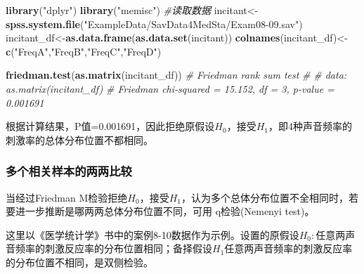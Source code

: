 \documentclass[
]{article}
\newenvironment{Shaded}{\begin{snugshade}}{\end{snugshade}}
\newcommand{\CommentTok}[1]{\textcolor[rgb]{0.56,0.35,0.01}{\textit{#1}}}
\newcommand{\KeywordTok}[1]{\textcolor[rgb]{0.13,0.29,0.53}{\textbf{#1}}}
\newcommand{\NormalTok}[1]{#1}
\newcommand{\StringTok}[1]{\textcolor[rgb]{0.31,0.60,0.02}{#1}}
\begin{document}
\begin{Shaded}
\begin{Highlighting}[]
\KeywordTok{library}\NormalTok{(}\StringTok{"dplyr"}\NormalTok{)}
\KeywordTok{library}\NormalTok{(}\StringTok{"memisc"}\NormalTok{)}
\CommentTok{#读取数据}
\NormalTok{incitant<-}\KeywordTok{spss.system.file}\NormalTok{(}\StringTok{"ExampleData/SavData4MedSta/Exam08-09.sav"}\NormalTok{)}
\NormalTok{incitant_df<-}\KeywordTok{as.data.frame}\NormalTok{(}\KeywordTok{as.data.set}\NormalTok{(incitant))}
\KeywordTok{colnames}\NormalTok{(incitant_df)<-}\KeywordTok{c}\NormalTok{(}\StringTok{"FreqA"}\NormalTok{,}\StringTok{"FreqB"}\NormalTok{,}\StringTok{"FreqC"}\NormalTok{,}\StringTok{"FreqD"}\NormalTok{)}

\KeywordTok{friedman.test}\NormalTok{(}\KeywordTok{as.matrix}\NormalTok{(incitant_df))}
\CommentTok{#   Friedman rank sum test}
\CommentTok{# }
\CommentTok{# data:  as.matrix(incitant_df)}
\CommentTok{# Friedman chi-squared = 15.152, df = 3, p-value = 0.001691}
\end{Highlighting}
\end{Shaded}

根据计算结果，P值=0.001691，因此拒绝原假设\(H_0\)，接受\(H_1\)，即4种声音频率的刺激率的总体分布位置不都相同。

\hypertarget{ux591aux4e2aux76f8ux5173ux6837ux672cux7684ux4e24ux4e24ux6bd4ux8f83}{%
\subsubsection{多个相关样本的两两比较}\label{ux591aux4e2aux76f8ux5173ux6837ux672cux7684ux4e24ux4e24ux6bd4ux8f83}}

当经过Friedman M检验拒绝\(H_0\)，接受\(H_1\)，认为多个总体分布位置不全相同时，若要进一步推断是哪两两总体分布位置不同，可用 q检验(Nemenyi test)。

这里以《医学统计学》书中的案例8-10数据作为示例。设置的原假设\(H_0:\)任意两声音频率的刺激反应率的分布位置相同；备择假设\(H_1\)任意两声音频率的刺激反应率的分布位置不相同，是双侧检验。
\end{document}
